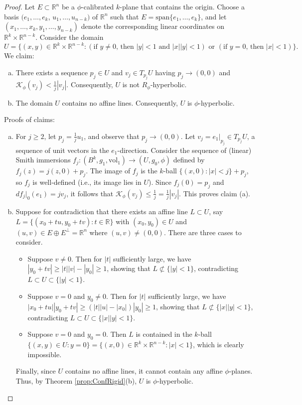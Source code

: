 \documentclass[10pt,a4paper]{amsart}
\newcommand{\R}{\mathbb{R}}
\newcommand{\vol}{\mathrm{vol}}
\begin{document}
\begin{proof}  Let $E \subset \R^n$ be a $\phi$-calibrated $k$-plane that contains the origin.  Choose a basis $(e_1, \ldots, e_k$, $u_1, \ldots, u_{n-k})$ of $\R^n$ such that $E = \mathrm{span}\{e_1, \ldots, e_k\}$, and let $(x_1, \ldots, x_k, y_1, \ldots, y_{n-k})$ denote the corresponding linear coordinates on $\R^k \times \R^{n-k}$.  Consider the domain
$$U = \{ (x,y) \in \R^k \times \R^{n-k} \colon (\text{if }y \neq 0, \,\text{then } |y| < 1 \text{ and } |x| |y| < 1) \text{ or } (\text{if }y = 0, \,\text{then } |x| < 1) \}.$$
We claim:
\begin{enumerate}[(a)]
\item There exists a sequence $p_j \in U$ and $v_j \in T_{p_j}U$ having $p_j \to (0,0)$ and $\mathcal{K}_\phi(v_j) < \frac{1}{j}|v_j|$.  Consequently, $U$ is not $R_\phi$-hyperbolic.
\item The domain $U$ contains no affine lines.  Consequently, $U$ is $\phi$-hyperbolic.
\end{enumerate}
Proofs of claims:
\begin{enumerate}[(a)]
\item For $j \geq 2$, let $p_j = \frac{1}{j}u_1$, and observe that $p_j \to (0,0)$.  Let $v_j = e_1|_{p_j} \in T_{p_j}U$, a sequence of unit vectors in the $e_1$-direction.  Consider the sequence of (linear) Smith immersions $f_j \colon (B^k, g_1, \vol_1) \to (U, g_0, \phi)$ defined by $f_j(z) = j(z,0) + p_j$.  The image of $f_j$ is the $k$-ball $\{(x,0) \colon |x| < j\} + p_j$, so $f_j$ is well-defined (i.e., its image lies in $U$).  Since $f_j(0) = p_j$ and $df_j|_0(e_1) = jv_j$, it follows that $\mathcal{K}_\phi(v_j) \leq \frac{1}{j} = \frac{1}{j}|v_j|$.  This proves claim (a).
\item Suppose for contradiction that there exists an affine line $L \subset U$, say $L =  \{(x_0 + tu, y_0 + tv) \colon t \in \R\}$
with $(x_0, y_0) \in U$ and $(u,v) \in E \oplus E^\perp = \R^n$ where $(u,v) \neq (0,0)$.  There are three cases to consider.
\begin{itemize}
\item Suppose $v \neq 0$.  Then for $|t|$ sufficiently large, we have $|y_0 + tv| \geq |t| |v| - |y_0| \geq 1$, showing that $L \not\subset \{ |y| < 1\}$, contradicting $L \subset U \subset \{|y| < 1\}$.
\item Suppose $v = 0$ and $y_0 \neq 0$.  Then for $|t|$ sufficiently large, we have $|x_0 + tu| |y_0 + tv| \geq  (|t| |u| - |x_0|)|y_0| \geq 1$, showing that $L \not\subset \{|x| |y| < 1\}$, contradicting $L \subset U \subset \{|x| |y| < 1\}$.
\item Suppose $v = 0$ and $y_0 = 0$.  Then $L$ is contained in the $k$-ball $\{(x,y) \in U \colon y = 0\} = \{(x,0) \in \R^k \times \R^{n-k} \colon |x| < 1\}$, which is clearly impossible.
\end{itemize}
Finally, since $U$ contains no affine lines, it cannot contain any affine $\phi$-planes.  Thus, by Theorem \ref{prop:ConfRigid}(b), $U$ is $\phi$-hyperbolic.
\end{enumerate}
\end{proof}
\end{document}

